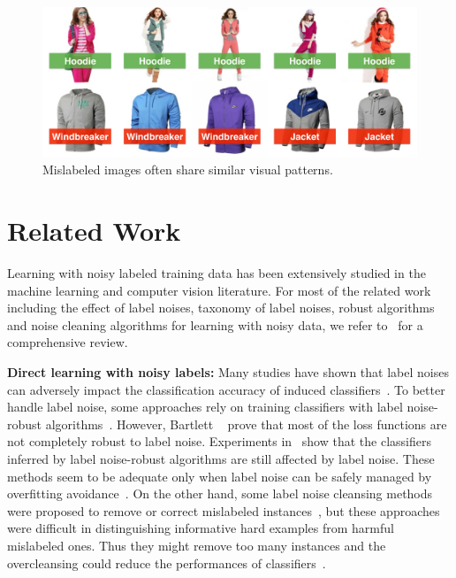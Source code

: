 \documentclass[10pt,twocolumn,letterpaper]{article}
\begin{document}
\begin{figure}[t]
\begin{center}
\includegraphics[width=1.0\linewidth]{figure/noise_cluster.pdf}
\end{center}
\caption{Mislabeled images often share similar visual patterns.}
\label{fig:noise_cluster}
\end{figure}

\section{Related Work} %
\label{sec:related_work}
Learning with noisy labeled training data has been extensively studied in the machine learning and computer vision literature. For most of the related work including the effect of label noises, taxonomy of label noises, robust algorithms and noise cleaning algorithms for learning with noisy data, we refer to~\cite{frenay2014classification} for a comprehensive review. 

{\bf Direct learning with noisy labels:} Many studies have shown that label noises can adversely impact the classification accuracy of induced classifiers~\cite{zhu2004class}. To better handle label noise, some approaches rely on training classifiers with label noise-robust algorithms~\cite{beigman2009learning,manwani2013noise}. However, Bartlett \etal~\cite{bartlett2006convexity} prove that most of the loss functions are not completely robust to label noise. Experiments in~\cite{teng2001comparison} show that the classifiers inferred by label noise-robust algorithms are still affected by label noise. These methods seem to be adequate only when label noise can be safely managed by overfitting avoidance~\cite{frenay2014classification}. On the other hand, some label noise cleansing methods were proposed to remove or correct mislabeled instances~\cite{barandela2000decontamination,brodley2011identifying,miranda2009use}, but these approaches were difficult in distinguishing informative hard examples from harmful mislabeled ones. Thus they might remove too many instances and the overcleansing could reduce the performances of classifiers~\cite{matic1992computer}.
\end{document}
